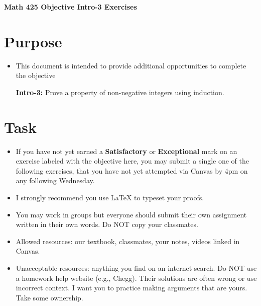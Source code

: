 \documentclass[12pt]{article}
\begin{document}
	\begin{center}
		{\Large \bf Math 425 Objective Intro-3 Exercises}
	\end{center}
	\section*{Purpose}
	\begin{itemize}
		\item This document is intended to provide additional opportunities to complete the objective
		
			\textbf{Intro-3:} Prove a property of non-negative integers using induction.

	\end{itemize}
	\section*{Task}
	\begin{itemize}
		\item If you have not yet earned a \textbf{Satisfactory} or \textbf{Exceptional} mark on an exercise labeled with the objective here, you may submit a single one of the following exercises, that you have not yet attempted via Canvas by 4pm on any following Wednesday.
		\item I strongly recommend you use LaTeX to typeset your proofs.
		\item You may work in groups but everyone should submit their own assignment written in their own words.  Do NOT copy your classmates.
		\item Allowed resources: our textbook, classmates, your notes, videos linked in Canvas.
		\item Unacceptable resources: anything you find on an internet search. Do NOT use a homework help website (e.g., Chegg). Their solutions are often wrong or use incorrect context.  I want you to practice making arguments that are yours. Take some ownership.
	\end{itemize}
\end{document}
